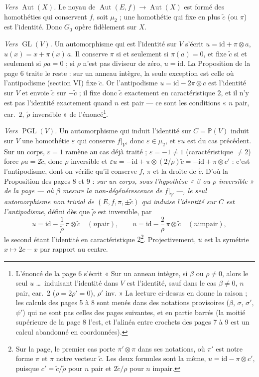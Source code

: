 \documentclass[11pt,a4paper]{article}
\begin{document}
\emph{Vers $\operatorname{Aut}(X)$.} Le noyau de $\operatorname{Aut}(E, f)
\to \operatorname{Aut}(X)$ est formé des homothéties qui conservent $f$, soit
$\mu_2$ ; une homothétie qui fixe en plus $\tilde c$ (ou $\pi$) est
l'identité. Donc $G_0$ opère fidèlement sur $X$.

\emph{Vers $\operatorname{GL}(V)$.} Un automorphisme qui est l'identité sur
$V$ s'écrit $u = \mathrm{id} + \pi \otimes a$, $u(x) = x + \pi(x)\, a$. Il
conserve $\pi$ si et seulement si $\pi(a) = 0$, et fixe $\tilde c$ si et
seulement si $\rho a = 0$ ; si $\rho$ n'est pas diviseur de zéro, $u =
\mathrm{id}$. La Proposition de la page 6 traite le reste : sur un anneau
intègre, la seule exception est celle où l'antipodisme (section VI) fixe
$\tilde c$. Or l'antipodisme $u = \mathrm{id} - 2\pi \otimes c$ est
l'identité sur $V$ et envoie $\tilde c$ sur $-\tilde c$ ; il fixe donc
$\tilde c$ exactement en caractéristique $2$, et il n'y est pas l'identité
exactement quand $n$ est pair --- ce sont les conditions « $n$ pair, car.\ $2$,
$\tilde\rho$ inversible » de l'énoncé\footnote{L'énoncé de la page 6 s'écrit
« Sur un anneau intègre, si $\beta$ ou $\rho \neq 0$, alors le seul $u$
\ldots\ induisant l'identité dans $V$ est l'identité, sauf dans le cas $\beta
\neq 0$, $n$ pair, car.\ 2 ($\rho = 2\rho' = 0$), $\rho'$ inv. » La lecture
ci-dessus en donne la raison ; les calculs des pages 5 à 8 sont menés dans des
notations provisoires ($\beta$, $\sigma$, $\sigma'$, $\psi'$) qui ne sont pas
celles des pages suivantes, et en partie barrés (la moitié supérieure de la
page 8 l'est, et l'alinéa entre crochets des pages 7 à 9 est un calcul
abandonné en coordonnées).}.

\emph{Vers $\operatorname{PGL}(V)$.} Un automorphisme qui induit l'identité
sur $C = \mathbb{P}(V)$ induit sur $V$ une homothétie $\varepsilon$ qui
conserve $f|_V$, donc $\varepsilon \in \mu_2$, et $\varepsilon u$ est du cas
précédent. Sur un corps, $\varepsilon = 1$ ramène au cas déjà traité ;
$\varepsilon = -1 \neq 1$ (caractéristique $\neq 2$) force $\rho a = 2\tilde
c$, donc $\rho$ inversible et $\varepsilon u = -\mathrm{id} + \pi \otimes
(2/\rho)\tilde c = -\mathrm{id} + \pi \otimes c'$ : c'est l'antipodisme, dont
on vérifie qu'il conserve $f$, $\pi$ et la droite de $\tilde c$. D'où la
Proposition des pages 8 et 9 : \emph{sur un corps, sous l'hypothèse « $\beta$ ou
$\rho$ inversible » de la page --- où $\beta$ mesure la non-dégénérescence de
$f|_V$ ---, le seul automorphisme non trivial de $(E, f, \pi, \pm\tilde c)$ qui
induise l'identité sur $C$ est l'antipodisme}, défini dès que $\tilde\rho$ est inversible, par
\[
u = \mathrm{id} - \frac{1}{\tilde\rho}\, \pi \otimes \tilde c \quad (n \text{
pair}), \qquad
u = \mathrm{id} - \frac{2}{\rho}\, \pi \otimes \tilde c \quad (n \text{
impair}),
\]
le second étant l'identité en caractéristique $2$\footnote{Sur la page, le
premier cas porte $\pi' \otimes \pi$ dans ses notations, où $\pi'$ est notre
forme $\pi$ et $\pi$ notre vecteur $\tilde c$. Les deux formules sont la même,
$u = \mathrm{id} - \pi \otimes c'$, puisque $c' = \tilde c/\tilde\rho$ pour $n$
pair et $2\tilde c/\rho$ pour $n$ impair.}. Projectivement, $u$ est la symétrie
$x \mapsto 2c - x$ par rapport au centre.
\end{document}

